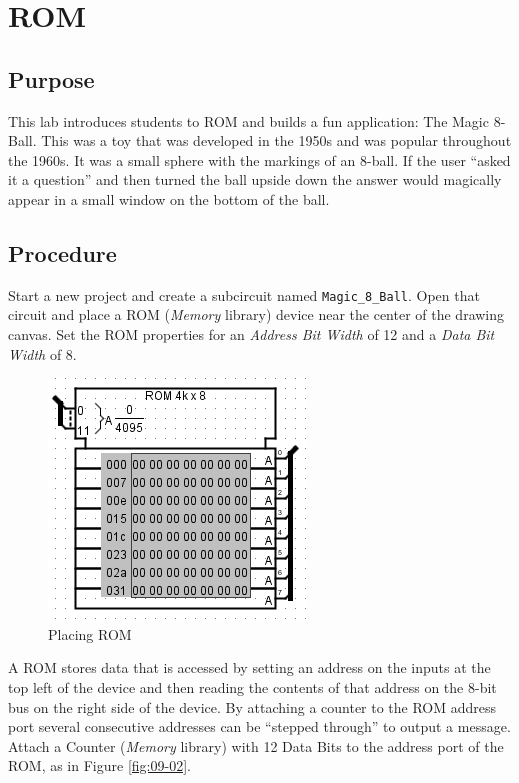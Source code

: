 \chapter{ROM}\label{Lab09}

\section{Purpose}

This lab introduces students to \acf{ROM} and builds a fun application: The Magic 8-Ball. This was a toy that was developed in the 1950s and was popular throughout the 1960s. It was a small sphere with the markings of an 8-ball. If the user ``asked it a question'' and then turned the ball upside down the answer would magically appear in a small window on the bottom of the ball.

\section{Procedure}

Start a new \LE project and create a subcircuit named \lstinline[columns=fixed]|Magic_8_Ball|. Open that circuit and place a ROM (\textit{Memory} library) device near the center of the drawing canvas. Set the ROM properties for an \textit{Address Bit Width} of 12 and a \textit{Data Bit Width} of 8.

\begin{figure}[H]
	\centering
	\includegraphics[width=\maxwidth{.95\linewidth}]{gfx/09-01}
	\caption{Placing ROM}
	\label{fig:09-01}
\end{figure}

A ROM stores data that is accessed by setting an address on the inputs at the top left of the device and then reading the contents of that address on the 8-bit bus on the right side of the device. By attaching a counter to the ROM address port several consecutive addresses can be ``stepped through'' to output a message. Attach a Counter (\textit{Memory} library) with 12 Data Bits to the address port of the ROM, as in Figure \ref{fig:09-02}.

